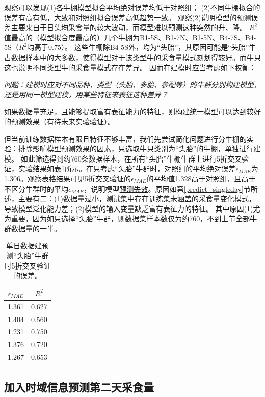 观察可以发现(1)各牛棚模型拟合平均绝对误差均低于对照组；
(2)不同牛棚拟合的误差有高有低，大致和对照组拟合误差高低趋势一致。
观察(2)说明模型的预测误差主要来自于日头均采食量的较大波动，而模型难以预测这种突然的升、降。
$R^2$值最高的（模型拟合度最高的）几个牛棚为B1-5S、B1-7N、B1-5N、B4-7S、B4-5S（$R^2$均高于0.75）。
这些牛棚除B4-5S外，均为“头胎”，其原因可能是“头胎”牛占数据样本中的大多数，使得模型对于该类型牛的采食量模式刻划得较好。而牛只这也说明不同类型牛的采食量模式存在差异。
因而在建模时应当考虑如下权衡：

\emph{问题：建模时应对不同品种、类型（头胎、多胎、参配等）的牛群分别构建模型，还是用同一模型建模，用某些特征来表征这种差异？}

如果数据量充足，且能够提取富有表征能力的特征，则构建统一模型可以达到较好的预测效果（有待未来实验验证）。

但当前训练数据样本有限且特征不够丰富，我们先尝试简化问题进行分牛棚的实验：排除影响模型预测效果的因素，只选取牛只类别为“头胎”的牛棚，单独进行建模。
如此筛选得到约760条数据样本，在所有“头胎”牛棚牛群上进行5折交叉验证，实验结果如表\ref{tab:singleday_first_predict_all}所示。在只考虑“头胎”牛群时，对照组的平均绝对误差$\epsilon_{MAE}$为1.306。观察表格结果可见5折交叉验证的$\epsilon_{MAE}$的平均值1.328高于对照组，且高于不区分牛群时的平均$\epsilon_{MAE}$，说明模型\uline{预测失效}。原因如第\ref{predict_singleday}节所述，主要有二：(1)数据量过小，测试集中存在训练集未涵盖的采食量变化模式，导致模型泛化能力差；(2)模型的输入变量缺乏富有表征力的特征。
其中原因(1)尤为重要，因为如只选择“头胎”牛群，则数据集样本数仅为约760，不到上节全部牛群数据量的一半。

\begin{table}
\caption{单日数据建预测“头胎”牛群时5折交叉验证的误差。}
\begin{center}
\footnotesize
\begin{tabular}{|c|c|}
\hline
	$\epsilon_{MAE}$ & $R^2$ \\
\hline
  1.361  &  0.627 \\
 1.404  &  0.560 \\
 1.231  &  0.750 \\
 1.376  &  0.720 \\
 1.267  &  0.653 \\
\hline
\end{tabular}
\end{center}
\label{tab:singleday_first_predict_all}
\end{table}




\subsection{加入时域信息预测第二天采食量}
\label{temporal}


